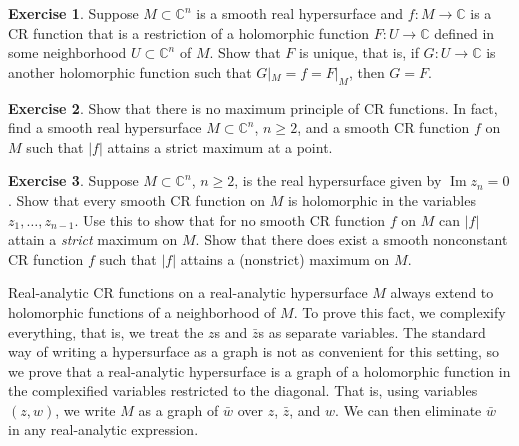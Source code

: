 \documentclass[12pt,openany]{book}
\renewcommand{\Im}{\operatorname{Im}}
\newcommand{\sabs}[1]{\lvert {#1} \rvert}
\newcommand{\C}{{\mathbb{C}}}
\theoremstyle{plain}
\theoremstyle{remark}
\theoremstyle{definition}
\newenvironment{exbox}{%
    \def\FrameCommand{\vrule width 1pt \relax\hspace{10pt}}%
    \MakeFramed{\advance\hsize-\width\FrameRestore}%
}{%
    \endMakeFramed
}
\theoremstyle{exercise}
\newtheorem{exercise}{Exercise}[section]
\theoremstyle{example}
\begin{document}
\begin{exbox}
\begin{exercise}
Suppose $M \subset \C^n$ is a smooth real hypersurface
and $f \colon M \to \C$ is a CR function that is a restriction
of a holomorphic function $F \colon U \to \C$ defined in
some neighborhood $U \subset \C^n$ of $M$.  Show that $F$ is unique,
that is, if $G \colon U \to \C$ is another holomorphic function such that
$G|_M = f = F|_M$, then $G=F$.
\end{exercise}

\begin{exercise}
Show that there is no maximum principle of CR functions.  In fact, find a
smooth real hypersurface $M \subset \C^n$, $n \geq 2$, and a smooth CR function
$f$ on $M$ such that $\sabs{f}$ attains a strict maximum at a point.
\end{exercise}

\begin{exercise}
Suppose $M \subset \C^n$, $n \geq 2$, is the real hypersurface given
by $\Im z_n = 0$.
Show that every smooth CR function on $M$ is holomorphic in the variables
$z_1,\ldots,z_{n-1}$.
Use this to show that for no smooth CR function $f$ on $M$ can
$\sabs{f}$ attain a \emph{strict} maximum on $M$.  Show that there does
exist a smooth nonconstant CR function $f$ such that $\sabs{f}$ attains a (nonstrict)
maximum on $M$.
\end{exercise}
\end{exbox}

Real-analytic CR functions on a real-analytic
hypersurface $M$ always extend to holomorphic functions of a neighborhood of $M$.
To prove this fact, we complexify everything, that is, we treat the
$z$s and $\bar{z}$s as separate variables.  The standard way of
writing a hypersurface as a graph is not as convenient for this setting, so
we prove that a real-analytic hypersurface is a
graph of a holomorphic function in the complexified variables restricted to
the diagonal.  That is,
using variables $(z,w)$,
we write $M$ as a graph of $\bar{w}$ over $z$, $\bar{z}$, and $w$.
We can then eliminate $\bar{w}$ in any real-analytic
expression.
\end{document}
